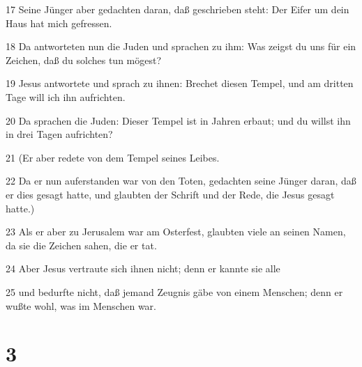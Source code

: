\par 17 Seine Jünger aber gedachten daran, daß geschrieben steht: Der Eifer um dein Haus hat mich gefressen.
\par 18 Da antworteten nun die Juden und sprachen zu ihm: Was zeigst du uns für ein Zeichen, daß du solches tun mögest?
\par 19 Jesus antwortete und sprach zu ihnen: Brechet diesen Tempel, und am dritten Tage will ich ihn aufrichten.
\par 20 Da sprachen die Juden: Dieser Tempel ist in Jahren erbaut; und du willst ihn in drei Tagen aufrichten?
\par 21 (Er aber redete von dem Tempel seines Leibes.
\par 22 Da er nun auferstanden war von den Toten, gedachten seine Jünger daran, daß er dies gesagt hatte, und glaubten der Schrift und der Rede, die Jesus gesagt hatte.)
\par 23 Als er aber zu Jerusalem war am Osterfest, glaubten viele an seinen Namen, da sie die Zeichen sahen, die er tat.
\par 24 Aber Jesus vertraute sich ihnen nicht; denn er kannte sie alle
\par 25 und bedurfte nicht, daß jemand Zeugnis gäbe von einem Menschen; denn er wußte wohl, was im Menschen war.

\chapter{3}

